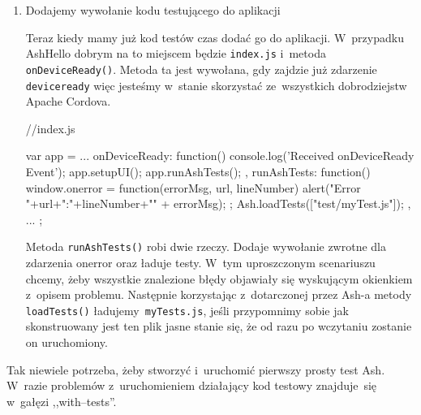\documentclass[brudnopis]{xmgr}
\begin{document}
\begin{enumerate}
\begin{javascriptcode}
{      //jesli aplikacja dotarła tutaj,
      //  to zaliczmy ten przypadek testowy
      Ash.endTest();
    });
\end{javascriptcode}

Powyższy kod nie jest bardziej skomplikowany od poprzedniego. Jedyną nowością jest zastosowanie wielu bloków 

\begin{quote}
  \texttt{then(function(){ ... })}
\end{quote}

które są wykonywane jeden po drugim w~kolejności podania i~pozwalają nam łączyć mniejsze funkcje testujace w~bardziej złożone bloki.

 \item Dodajemy wywołanie kodu testującego do aplikacji

Teraz kiedy mamy już kod testów czas dodać go do aplikacji. W~przypadku AshHello dobrym na to miejscem będzie \texttt{index.js} i~metoda \mbox{\texttt{onDeviceReady()}}. Metoda ta jest wywołana, gdy zajdzie już zdarzenie \texttt{deviceready} więc jesteśmy w~stanie skorzystać ze~wszystkich dobrodziejstw Apache Cordova.

 \begin{javascriptcode}
  //index.js
  
  var app = {
	...
    onDeviceReady: function() {
        console.log('Received onDeviceReady Event');
        app.setupUI();
        app.runAshTests();
    },
    runAshTests: function() {
        window.onerror = function(errorMsg, url, lineNumber) {
            alert("Error "+url+":"+lineNumber+"\n" + errorMsg);
        };
        Ash.loadTests(["test/myTest.js"]);
    },
	...
  };

\end{javascriptcode}

Metoda \texttt{runAshTests()} robi dwie rzeczy. Dodaje wywołanie zwrotne dla zdarzenia onerror oraz ładuje testy. W~tym uproszczonym scenariuszu chcemy, żeby wszystkie znalezione błędy objawiały się wyskującym okienkiem z~opisem problemu. Następnie korzystając z~dotarczonej przez Ash-a metody \texttt{loadTests()} ładujemy\texttt{ myTests.js}, jeśli przypomnimy sobie jak skonstruowany jest ten plik jasne stanie się, że od razu po wczytaniu zostanie on uruchomiony. 

\end{enumerate}

Tak niewiele potrzeba, żeby stworzyć i~uruchomić pierwszy prosty test Ash. W~razie problemów z~uruchomieniem działający kod testowy znajduje~się w~gałęzi ,,with--tests''.
\end{document}
